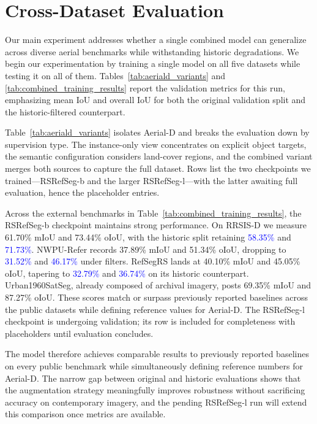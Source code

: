 \section{Cross-Dataset Evaluation}

Our main experiment addresses whether a single combined model can generalize across diverse aerial benchmarks while withstanding historic degradations. We begin our experimentation by training a single model on all five datasets while testing it on all of them. Tables~\ref{tab:aeriald_variants} and \ref{tab:combined_training_results} report the validation metrics for this run, emphasizing mean IoU and overall IoU for both the original validation split and the historic-filtered counterpart.

Table~\ref{tab:aeriald_variants} isolates Aerial-D and breaks the evaluation down by supervision type. The instance-only view concentrates on explicit object targets, the semantic configuration considers land-cover regions, and the combined variant merges both sources to capture the full dataset. Rows list the two checkpoints we trained—RSRefSeg-b and the larger RSRefSeg-l—with the latter awaiting full evaluation, hence the placeholder entries.

Across the external benchmarks in Table~\ref{tab:combined_training_results}, the RSRefSeg-b checkpoint maintains strong performance. On RRSIS-D we measure 61.70\% mIoU and 73.44\% oIoU, with the historic split retaining \textcolor{blue}{58.35\%} and \textcolor{blue}{71.73\%}. NWPU-Refer records 37.89\% mIoU and 51.34\% oIoU, dropping to \textcolor{blue}{31.52\%} and \textcolor{blue}{46.17\%} under filters. RefSegRS lands at 40.10\% mIoU and 45.05\% oIoU, tapering to \textcolor{blue}{32.79\%} and \textcolor{blue}{36.74\%} on its historic counterpart. Urban1960SatSeg, already composed of archival imagery, posts 69.35\% mIoU and 87.27\% oIoU. These scores match or surpass previously reported baselines across the public datasets while defining reference values for Aerial-D. The RSRefSeg-l checkpoint is undergoing validation; its row is included for completeness with placeholders until evaluation concludes.

The model therefore achieves comparable results to previously reported baselines on every public benchmark while simultaneously defining reference numbers for Aerial-D. The narrow gap between original and historic evaluations shows that the augmentation strategy meaningfully improves robustness without sacrificing accuracy on contemporary imagery, and the pending RSRefSeg-l run will extend this comparison once metrics are available.

